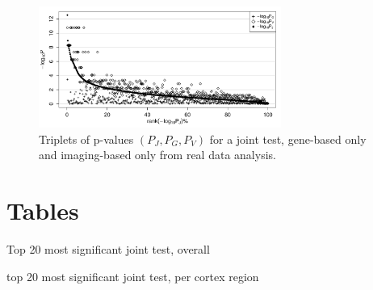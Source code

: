 \documentclass[11pt]{article}
\def\style{apa}
\begin{document}
% 
\begin{figure}[!h]
  \centering
  \includegraphics[width=300px]{img/RDA_PVL.png}
  \caption{Triplets of p-values $(P_J, P_G, P_V)$ for a joint test, gene-based only and imaging-based only from real data analysis.}\label{fig:RDA_PVL}
\end{figure}
\clearpage
\section*{Tables}
\begin{table}[!htbp]
  \centering
  \small
  \caption{Top 20 most significant joint test, overall}\label{tab:RDA_T20}
  
\end{table} 
% 
\begin{table}[!htbp]
  \centering
  \small
  \caption{top 20 most significant joint test, per cortex region}\label{tab:RDA_JNT}
  
\end{table} 
%
\singlespacing


%
\end{document}

